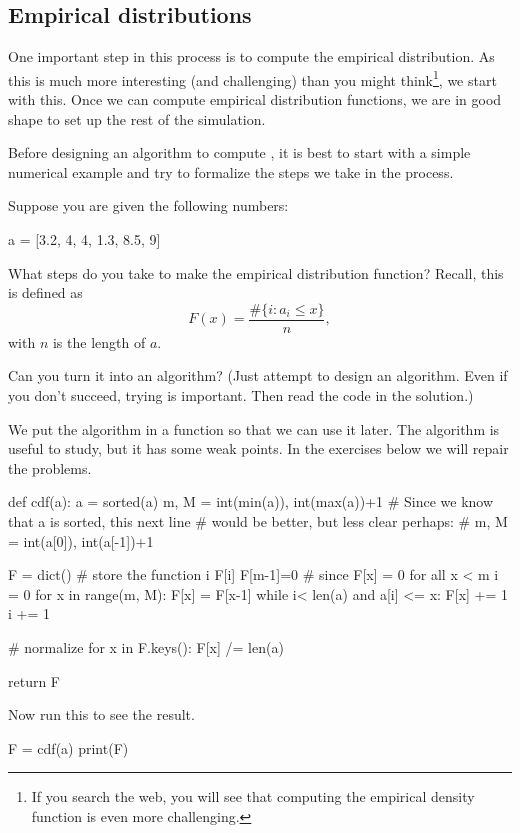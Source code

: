\subsection{Empirical distributions}
\label{sec:empir-distr}

One important step in this process is to compute the empirical distribution. As this is much more interesting (and challenging) than you might think\footnote{If you search the web, you will see that computing the empirical density function is even more challenging.}, we start with this. Once we can compute empirical distribution functions, we are in good shape to set up the rest of the simulation. 

Before designing an algorithm to compute , it is best to start with a simple numerical example and try to formalize the steps we take in the process.

\begin{exercise}
  Suppose you are given the following numbers:
  \begin{pyblock}
a = [3.2, 4, 4, 1.3, 8.5, 9]    
\end{pyblock}

 What steps do you take to make the empirical distribution function? Recall, this is defined as
  \begin{equation}
    \label{eq:1}
    F(x) = \frac{\# \{i : a_i \leq x\}}{n}, 
  \end{equation}
  with $n$ is the length of $a$.

Can you turn it into an algorithm? (Just attempt to design an algorithm. Even if you don't succeed, trying is important. Then read the code in the solution.)

  \begin{solution}
We put the algorithm in a function so that we can use it later.  The algorithm is useful to study,  but it has some weak points. In the exercises below we will repair the problems. 
    \begin{pyblock}
def cdf(a):
    a = sorted(a)
    m, M = int(min(a)), int(max(a))+1
    # Since we know that a is sorted, this next line 
    # would be better, but less clear perhaps: 
    # m, M = int(a[0]), int(a[-1])+1 

    F = dict() # store the function i \to F[i]
    F[m-1]=0  # since F[x] = 0 for all x < m
    i = 0
    for x in range(m, M):
        F[x] = F[x-1]
        while i< len(a) and a[i] <= x:
            F[x] += 1
            i += 1

    # normalize
    for x in F.keys(): 
        F[x] /= len(a)

    return F
    \end{pyblock}

Now run  this to see the result.
\begin{pyblock}
F = cdf(a)
print(F)
\end{pyblock}


  \end{solution}
\end{exercise}

